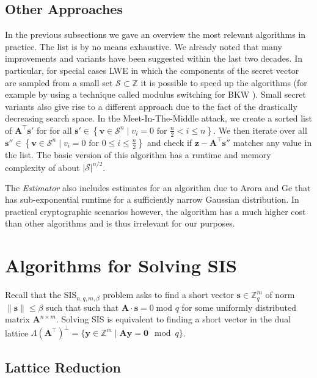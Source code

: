 \subsection{Other Approaches}
In the previous subsections we gave an overview the most relevant algorithms in practice. The list is by no means exhaustive. We already noted that many improvements and variants have been suggested within the last two decades. In particular, for special cases LWE in which the components of the secret vector are sampled from a small set $\mathcal{S} \subset \mathbb{Z}$ it is possible to speed up the algorithms (for example by using a technique called modulus switching for BKW \cite{AFFP14}). %
Small secret variants also give rise to a different approach due to the fact of the drastically decreasing search space. In the Meet-In-The-Middle attack, we create a sorted list of $\mathbf{A}^\intercal \mathbf{s}'$ for for all $\mathbf{s}' \in \left\{ \mathbf{v} \in \mathcal{S}^n \mid v_i = 0 \text{ for } \frac{n}{2} < i \leq n\right\}$. We then iterate over all $\mathbf{s}'' \in \left\{ \mathbf{v} \in \mathcal{S}^n \mid v_i = 0 \text{ for } 0 \leq i \leq \frac{n}{2}\right\}$ and check if $\mathbf{z} - \mathbf{A}^\intercal \mathbf{s}''$ matches any value in the list. The basic version of this algorithm has a runtime and memory complexity of about $|\mathcal{S}|^{n/2}$.

The \textit{Estimator} also includes estimates for an algorithm due to Arora and Ge \cite{AG11} that has sub-exponential runtime for a sufficiently narrow Gaussian distribution. In practical cryptographic scenarios however, the algorithm has a much higher cost than other algorithms and is thus irrelevant for our purposes.


\section{Algorithms for Solving SIS}
Recall that the SIS$_{n, q, m, \beta}$ problem asks to find a short vector $\mathbf{s} \in \mathbb{Z}_q^m$ of norm $\|\mathbf{s}\| \leq \beta$ such that such that $\mathbf{A} \cdot \mathbf{s} = 0 \; \text{mod } q$ for some uniformly distributed matrix $\mathbf{A}^{n\times m}$. Solving SIS is equivalent to finding a short vector in the dual lattice $\Lambda(\mathbf{A}^\intercal)^{\perp} = \{ \mathbf{y} \in \mathbb{Z}^m \mid \mathbf{A} \mathbf{y} = \mathbf{0} \mod q\}$.


\subsection{Lattice Reduction}
